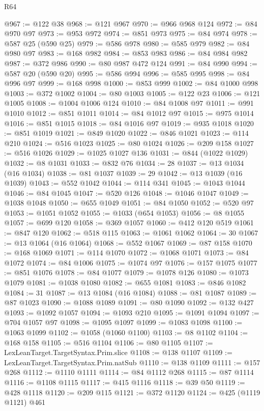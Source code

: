 \begin{lexlean}{R64}
\begin{coremodule}
@967 := @122 @38
@968 := @121 @967
@970 := @966 @968 @124
@972 := @84 @970 @97
@973 := @953 @972
@974 := @851 @973
@975 := @84 @974
@978 := @587 @25 (@590 @25)
@979 := @586 @978
@980 := @585 @979
@982 := @84 @980 @97
@983 := @168 @982
@984 := @853 @983
@986 := @84 @984 @982
@987 := @372 @986
@990 := @80 @987 @472 @124
@991 := @84 @990
@994 := @587 @20 (@590 @20)
@995 := @586 @994
@996 := @585 @995
@998 := @84 @996 @97
@999 := @168 @998
@1000 := @853 @999
@1002 := @84 @1000 @998
@1003 := @372 @1002
@1004 := @80 @1003
@1005 := @122 @23
@1006 := @121 @1005
@1008 := @1004 @1006 @124
@1010 := @84 @1008 @97
@1011 := @991 @1010
@1012 := @851 @1011
@1014 := @84 @1012 @97
@1015 := @975 @1014
@1016 := @851 @1015
@1018 := @84 @1016 @97
@1019 := @935 @1018
@1020 := @851 @1019
@1021 := @849 @1020
@1022 := @846 @1021
@1023 := @114 @210
@1024 := @516 @1023
@1025 := @80 @1024
@1026 := @209 @158
@1027 := @516 @1026
@1029 := @1025 @1027 @136
@1031 := @844 (@1022 @1029)
@1032 := @8 @1031
@1033 := @832 @76
@1034 := 28
@1037 := @13 @1034 (@16 @1034)
@1038 := @81 @1037
@1039 := 29
@1042 := @13 @1039 (@16 @1039)
@1043 := @552 @1042
@1044 := @114 @341
@1045 := @1043 @1044
@1046 := @84 @1045
@1047 := @520 @126
@1048 := @1046 @1047
@1049 := @1038 @1048
@1050 := @655 @1049
@1051 := @84 @1050
@1052 := @520 @97
@1053 := @1051 @1052
@1055 := @1033 (@654 @1053)
@1056 := @8 @1055
@1057 := @699 @120
@1058 := @369 @1057
@1060 := @412 @120 @519
@1061 := @847 @120
@1062 := @518 @115
@1063 := @1061 @1062
@1064 := 30
@1067 := @13 @1064 (@16 @1064)
@1068 := @552 @1067
@1069 := @87 @158
@1070 := @168 @1069
@1071 := @114 @1070
@1072 := @1068 @1071
@1073 := @84 @1072
@1074 := @84 @1006
@1075 := @1074 @97
@1076 := @157 @1075
@1077 := @851 @1076
@1078 := @84 @1077
@1079 := @1078 @126
@1080 := @1073 @1079
@1081 := @1038 @1080
@1082 := @655 @1081
@1083 := @846 @1082
@1084 := 31
@1087 := @13 @1084 (@16 @1084)
@1088 := @81 @1087
@1089 := @87 @1023
@1090 := @1088 @1089
@1091 := @80 @1090
@1092 := @132 @427
@1093 := @1092 @1057
@1094 := @1093 @210
@1095 := @1091 @1094
@1097 := @704 @1057 @97
@1098 := @1095 @1097
@1099 := @1083 @1098
@1100 := @1063 @1099
@1102 := @1058 (@1060 @1100)
@1103 := @8 @1102
@1104 := @168 @158
@1105 := @516 @1104
@1106 := @80 @1105
@1107 := LexLeanTarget.TargetSyntax.Prim.slice
@1108 := @138 @1107
@1109 := LexLeanTarget.TargetSyntax.Prim.natSub
@1110 := @138 @1109
@1111 := @157 @268
@1112 := @1110 @1111
@1114 := @84 @1112 @268
@1115 := @87 @1114
@1116 := @1108 @1115
@1117 := @415 @1116
@1118 := @39 @50
@1119 := @428 @1118
@1120 := @209 @115
@1121 := @372 @1120
@1124 := @425 (@1119 @1121) @461

\end{coremodule}
\end{lexlean}
